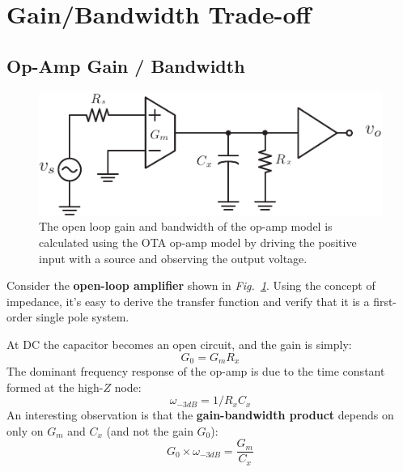 \section{Gain/Bandwidth Trade-off}
\subsection{Op-Amp Gain / Bandwidth}
\begin{figure}[tb]
\centering
\includegraphics[scale=1]{ota_amp_open}
\caption{The open loop gain and bandwidth of the op-amp model is calculated using the OTA op-amp model by driving the positive input with a source and observing the output voltage.}
\label{fig:ota_amp_open}
\end{figure}
Consider the \textbf{open-loop amplifier} shown in \emph{Fig.~\ref{fig:ota_amp_open}}.  Using the concept of impedance, it's easy to derive the transfer function and verify that it is a first-order single pole system.

\vspace{0.15cm}
\noindent
At DC the capacitor becomes an open circuit, and the gain is simply:
    \begin{equation}
        G_0 = {G_m}{R_x}
    \end{equation}
The dominant frequency response of the op-amp is due to the time constant formed at the high-$Z$ node:
    \begin{equation}
        \omega _{ - 3dB} = 1/{R_x}{C_x}
    \end{equation}
An interesting observation is that the \textbf{gain-bandwidth product} depends on only on $G_m$ and $C_x$ (and not the gain $G_0$): 
    \begin{equation}
        G_0 \times {\omega _{ - 3dB}} = \frac{{{G_m}}}{{{C_x}}}
    \end{equation}
